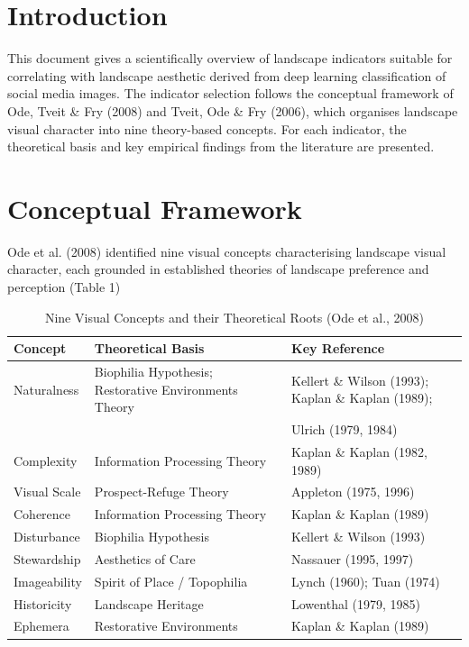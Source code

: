 \documentclass[hidelinks, 11pt]{article}
\begin{document}

\section{Introduction}\label{sec:Sota}
This document gives a scientifically overview of landscape indicators suitable for correlating with landscape aesthetic derived from deep learning classification of social media images. The indicator selection follows the conceptual framework of Ode, Tveit & Fry (2008) and Tveit, Ode & Fry (2006), which organises landscape visual character into nine theory-based concepts. For each indicator, the theoretical basis and key empirical findings from the literature are presented.

\section{Conceptual Framework}\label{sec:CF}
Ode et al. (2008) identified nine visual concepts characterising landscape visual character, each grounded in established theories of landscape preference and perception (Table 1)

\begin{table}[ht]
\centering
\caption{Nine Visual Concepts and their Theoretical Roots (Ode et al., 2008)}
\label{tab:concepts}
\begin{tabular}{lll}
\toprule
\textbf{Concept} & \textbf{Theoretical Basis} & \textbf{Key Reference} \\
\midrule
Naturalness      & Biophilia Hypothesis; Restorative Environments Theory 
                 & Kellert \& Wilson (1993); Kaplan \& Kaplan (1989); \\
                 & & Ulrich (1979, 1984) \\
\addlinespace
Complexity       & Information Processing Theory 
                 & Kaplan \& Kaplan (1982, 1989) \\
\addlinespace
Visual Scale     & Prospect-Refuge Theory 
                 & Appleton (1975, 1996) \\
\addlinespace
Coherence        & Information Processing Theory 
                 & Kaplan \& Kaplan (1989) \\
\addlinespace
Disturbance      & Biophilia Hypothesis 
                 & Kellert \& Wilson (1993) \\
\addlinespace
Stewardship      & Aesthetics of Care 
                 & Nassauer (1995, 1997) \\
\addlinespace
Imageability     & Spirit of Place / Topophilia 
                 & Lynch (1960); Tuan (1974) \\
\addlinespace
Historicity      & Landscape Heritage 
                 & Lowenthal (1979, 1985) \\
\addlinespace
Ephemera         & Restorative Environments 
                 & Kaplan \& Kaplan (1989) \\
\bottomrule
\end{tabular}
\end{table}
\end{document}
